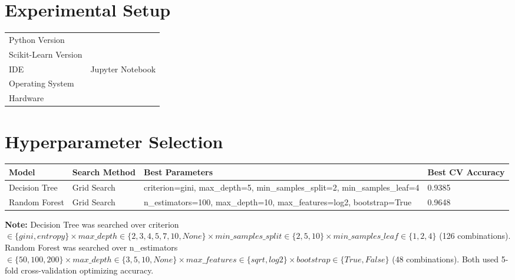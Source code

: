 \documentclass[12pt,a4paper]{article}
\begin{document}
\section{Experimental Setup}
\begin{tabular}{ll}
\toprule
Python Version & \\
Scikit-Learn Version & \\
IDE & Jupyter Notebook \\
Operating System & \\
Hardware & \\
\bottomrule
\end{tabular}

\section{Hyperparameter Selection}

\begin{longtable}{|p{3.2cm}|p{2.6cm}|p{5.5cm}|p{2.3cm}|}
\hline
\textbf{Model} & \textbf{Search Method} & \textbf{Best Parameters} & \textbf{Best CV Accuracy} \\ \hline
\endhead
Decision Tree & Grid Search & criterion=gini, max\_depth=5, min\_samples\_split=2, min\_samples\_leaf=4 & 0.9385 \\ \hline
Random Forest & Grid Search & n\_estimators=100, max\_depth=10, max\_features=log2, bootstrap=True & 0.9648 \\ \hline
\end{longtable}

\textbf{Note:} Decision Tree was searched over criterion $\in \{gini, entropy\} \times
max\_depth \in \{2,3,4,5,7,10,None\} \times min\_samples\_split \in \{2,5,10\} \times
min\_samples\_leaf \in \{1,2,4\}$ (126 combinations). Random Forest was searched over
n\_estimators $\in \{50,100,200\} \times max\_depth \in \{3,5,10,None\} \times max\_features
\in \{sqrt, log2\} \times bootstrap \in \{True, False\}$ (48 combinations). Both used 5-fold
cross-validation optimizing accuracy.
\end{document}

